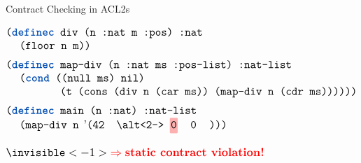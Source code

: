 \begin{frame}[t]{Contract Checking in ACL2s}

\[
\large
\begin{array}{@{}l@{}}
  \mex{(\kw{definec} div (n :nat m :pos) :nat} \\
  \hspace{1.2em}\mex{(floor n m))} \\[0.5em]
  \mex{(\kw{definec} map-div (n :nat ms :pos-list) :nat-list} \\
  \hspace{1.2em}\mex{(\kw{cond} ((null ms) nil)} \\
  \hspace{4.8em}\mex{(t (cons (div n (car ms)) (map-div n (cdr ms))))))} \\[0.5em]
  \mex{(\kw{definec} main (n :nat) :nat-list} \\
  \hspace{1.2em}\mex{(map-div n \codequote(42~\altcolor{2-}{red}{0})))} \\
  \\
  \invisible<-1>{\color{red}{\Rightarrow \textbf{static contract violation!}}}
\end{array}
\]

  \begin{itemize}
  \end{itemize}


\end{frame}


